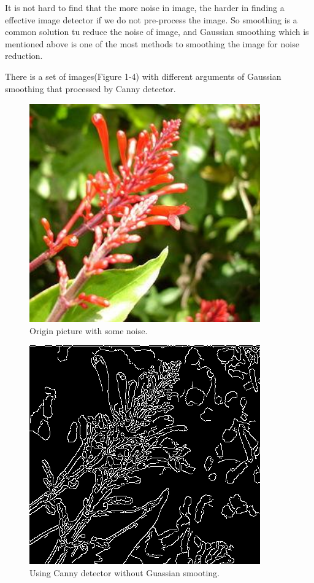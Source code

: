 \documentclass[10pt,twocolumn,letterpaper]{article}
\begin{document}
It is not hard to find that the more noise in image, the harder in finding a effective image 
detector if we do not pre-process the image. So smoothing is a common solution tu reduce the 
noise of image, and Gaussian smoothing which is mentioned above is one of the most methods to 
smoothing the image for noise reduction.

There is a set of images(Figure 1-4) with different arguments of Gaussian smoothing that processed by Canny 
detector.

\begin{figure}[htb]
   \begin{center}
      \includegraphics[width=0.8\linewidth]{../../code/tree.png}
   \end{center}
   \caption{Origin picture with some noise.}
   \label{fig:long}
   \label{fig:onecol}
\end{figure}

\begin{figure}[htb]
   \begin{center}
      \includegraphics[width=0.8\linewidth]{../../code/cannyTree.png}
   \end{center}
   \caption{Using Canny detector without Guassian smooting.}
   \label{fig:long}
   \label{fig:onecol}
\end{figure}
     
\end{document}
